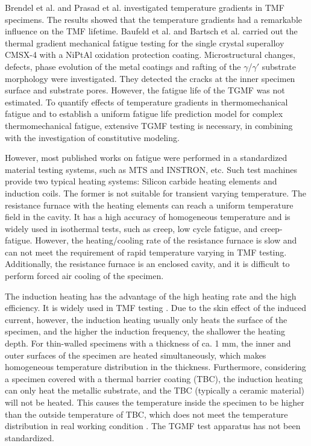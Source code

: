 \documentclass[preprint,5p,twocolumn,10pt,sort&compress]{elsarticle}
\begin{document}
Brendel et al. \cite{BRENDEL2008234} and Prasad et al. \cite{PRASAD2013131} investigated temperature gradients in TMF specimens. The results showed that the temperature gradients had a remarkable influence on the TMF lifetime.
Baufeld et al. \cite{BAUFELD2008219} and Bartsch et al. \cite{BARTSCH2008211} carried out the thermal gradient mechanical fatigue testing for the single crystal superalloy CMSX-4 with a NiPtAl oxidation protection coating.
Microstructural changes, defects, phase evolution of the metal coatings and rafting of the $\gamma$/$\gamma'$ substrate morphology were investigated. They detected the cracks at the inner specimen surface and substrate pores. However, the fatigue life of the TGMF was not estimated. To quantify effects of temperature gradients in thermomechanical fatigue and to establish a uniform fatigue life prediction model for complex thermomechanical fatigue, extensive TGMF testing is necessary, in combining with the investigation of constitutive modeling.

However, most published works on fatigue were performed in a standardized material testing systems, such as MTS and INSTRON, etc. Such test machines provide two typical heating systems: Silicon carbide heating elements and induction coils. The former is not suitable for transient varying temperature. 
The resistance furnace with the heating elements can reach a uniform temperature field in the cavity. It has a high accuracy of homogeneous temperature and is widely used in isothermal tests, such as creep, low cycle fatigue, and creep-fatigue. However, the heating/cooling rate of the resistance furnace is slow and can not meet the requirement of rapid temperature varying in TMF testing. Additionally, the resistance furnace is an enclosed cavity, and it is difficult to perform forced air cooling of the specimen.

The induction heating has the advantage of the high heating rate and the high efficiency. It is widely used in TMF testing \cite{Mao2015, Wang2017, SUN2019228,DENG2019813,BRENDEL2008234}.
Due to the skin effect of the induced current, however, the induction heating usually only heats the surface of the specimen, and the higher the induction frequency, the shallower the heating depth. For thin-walled specimens with a thickness of ca. 1 mm, the inner and outer surfaces of the specimen are heated simultaneously, which makes homogeneous temperature distribution in the thickness. Furthermore, considering a specimen covered with a thermal barrier coating (TBC), the induction heating can only heat the metallic substrate, and the TBC (typically a ceramic material) will not be heated. This causes the temperature inside the specimen to be higher than the outside temperature of TBC, which does not meet the temperature distribution in real working condition \cite{BRENDEL2008234}. The TGMF test apparatus has not been standardized. 
\end{document}
